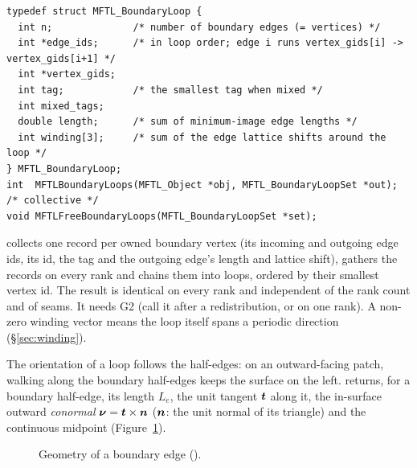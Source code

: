 \begin{lstlisting}[numbers=none]
typedef struct MFTL_BoundaryLoop {
  int n;              /* number of boundary edges (= vertices) */
  int *edge_ids;      /* in loop order; edge i runs vertex_gids[i] -> vertex_gids[i+1] */
  int *vertex_gids;
  int tag;            /* the smallest tag when mixed */
  int mixed_tags;
  double length;      /* sum of minimum-image edge lengths */
  int winding[3];     /* sum of the edge lattice shifts around the loop */
} MFTL_BoundaryLoop;
int  MFTLBoundaryLoops(MFTL_Object *obj, MFTL_BoundaryLoopSet *out);   /* collective */
void MFTLFreeBoundaryLoops(MFTL_BoundaryLoopSet *set);
\end{lstlisting}
 collects one record per owned boundary vertex (its incoming and outgoing
edge ids, its id, the tag and the outgoing edge's length and lattice shift), gathers the
records on every rank and chains them into loops, ordered by their smallest vertex id. The
result is identical on every rank and independent of the rank count and of seams. It needs G2
(call it after a redistribution, or on one rank). A non-zero winding vector means the loop
itself spans a periodic direction (\S\ref{sec:winding}).

The orientation of a loop follows the half-edges: on an outward-facing patch, walking along
the boundary half-edges keeps the surface on the left.  returns, for
a boundary half-edge, its length $L_e$, the unit tangent $\boldsymbol{t}$ along it, the in-surface
outward \emph{conormal} $\boldsymbol{\nu}=\boldsymbol{t}\times\boldsymbol{n}$ ($\boldsymbol{n}$: the unit normal of its
triangle) and the continuous midpoint (Figure~\ref{fig:conormal}).

\begin{figure}[ht]
\centering
{}
\caption{Geometry of a boundary edge ().}
\label{fig:conormal}
\end{figure}
